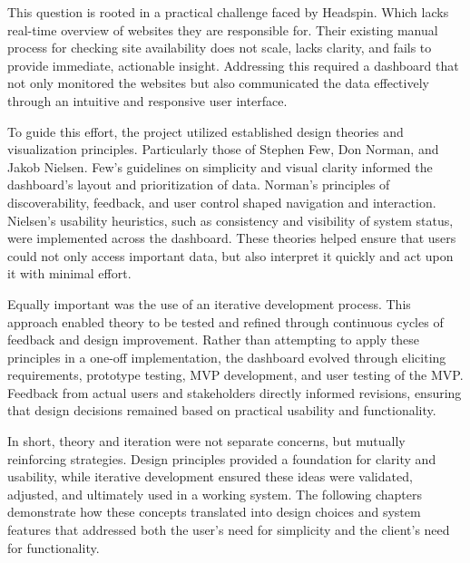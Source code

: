 This question is rooted in a practical challenge faced by Headspin. Which lacks real-time overview of websites they are responsible for. Their existing manual process for checking site availability does not scale, lacks clarity, and fails to provide immediate, actionable insight. Addressing this required a dashboard that not only monitored the websites but also communicated the data effectively through an intuitive and responsive user interface.

To guide this effort, the project utilized established design theories and visualization principles. Particularly those of Stephen Few, Don Norman, and Jakob Nielsen. Few’s guidelines on simplicity and visual clarity informed the dashboard’s layout and prioritization of data. Norman’s principles of discoverability, feedback, and user control shaped navigation and interaction. Nielsen’s usability heuristics, such as consistency and visibility of system status, were implemented across the dashboard. These theories helped ensure that users could not only access important data, but also interpret it quickly and act upon it with minimal effort.

Equally important was the use of an iterative development process. This approach enabled theory to be tested and refined through continuous cycles of feedback and design improvement. Rather than attempting to apply these principles in a one-off implementation, the dashboard evolved through eliciting requirements, prototype testing, MVP development, and user testing of the MVP. Feedback from actual users and stakeholders directly informed revisions, ensuring that design decisions remained based on practical usability and functionality.

In short, theory and iteration were not separate concerns, but mutually reinforcing strategies. Design principles provided a foundation for clarity and usability, while iterative development ensured these ideas were validated, adjusted, and ultimately used in a working system. The following chapters demonstrate how these concepts translated into design choices and system features that addressed both the user’s need for simplicity and the client’s need for functionality.
